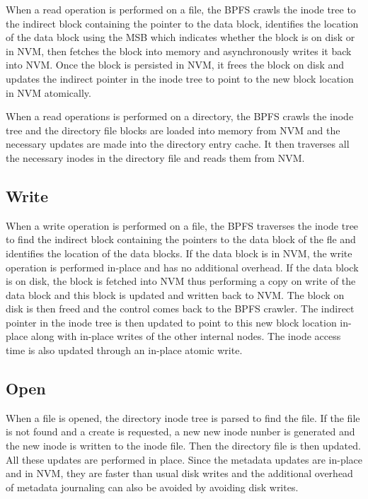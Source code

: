\documentclass[letterpaper, 10 pt, conference]{ieeeconf}  %
\begin{document}
When a read operation is performed on a file, the BPFS crawls the inode tree to the indirect block containing the pointer to the data block, identifies the location of the data block using the MSB which indicates whether the block is on disk or in NVM, then fetches the block into memory and asynchronously writes it back into NVM. Once the block is persisted in NVM, it frees the block on disk and updates the indirect pointer in the inode tree to point to the new block location in NVM atomically.

When a read operations is performed on a directory, the BPFS crawls the inode tree and the directory file blocks are loaded into memory from NVM and the necessary updates are made into the directory entry cache. It then traverses all the necessary inodes in the directory file and reads them from NVM.
 
\subsection{Write}

When a write operation is performed on a file, the BPFS traverses the inode tree to find the indirect block containing the pointers to the data block of the fle and identifies the location of the data blocks. If the data block is in NVM, the write operation is performed in-place and has no additional overhead. If the data block is on disk, the block is fetched into NVM thus performing a copy on write of the data block and this block is updated and written back to NVM. The block on disk is then freed and the control comes back to the BPFS crawler. The indirect pointer in the inode tree is then updated to point to this new block location in-place along with in-place writes of the other internal nodes. The inode access time is also updated through an in-place atomic write.


\subsection{Open}

When a file is opened, the directory inode tree is parsed to find the file. If the file is not found and a create is requested, a new new inode nunber is generated and the new inode is written to the inode file. Then the directory file is then updated. All these updates are performed in place. Since the metadata updates are in-place and in NVM, they are faster than usual disk writes and the additional overhead of metadata journaling can also be avoided by avoiding disk writes.
\end{document}
